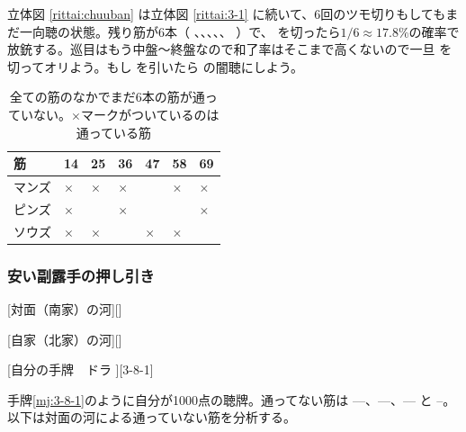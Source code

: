 \documentclass[10pt, twocolumn]{article}
\begin{document}
\begin{rittai}[h]
  \centering
  
  
  \caption{中盤の立体図}
  \label{rittai:chuuban}
\end{rittai}

立体図 \ref{rittai:chuuban} は立体図 \ref{rittai:3-1} に続いて、6回のツモ切りもしてもまだ一向聴の状態。残り筋が6本（ 、、、、、 ）で、 を切ったら$1/6\approx17.8\%$の確率で放銃する。巡目はもう中盤〜終盤なので和了率はそこまで高くないので一旦  を切ってオリよう。もし  を引いたら  の闇聴にしよう\citep[][pp. 40--45]{tetsuoshi}。

\begin{table}[ht]
  \centering
  \begin{tabular}{lllllll}
    筋    & 14 & 25 & 36 & 47 & 58 & 69 \\
    \hline
    マンズ & $\times$ & $\times$ & $\times$ & & $\times$ & $\times$ \\
    ピンズ & $\times$ & & $\times$ & & & $\times$ \\
    ソウズ & $\times$ & $\times$ & & $\times$ & $\times$ &
  \end{tabular}
  \caption{全ての筋のなかでまだ6本の筋が通っていない。$\times$マークがついているのは通っている筋}
\end{table}

\subsubsection*{安い副露手の押し引き}

[対面（南家）の河][]

[自家（北家）の河][]

[自分の手牌　ドラ ][3-8-1]

手牌\ref{mj:3-8-1}のように自分が1000点の聴牌。通ってない筋は ----、----、---- と --。以下は対面の河による通っていない筋を分析する\citep[][pp.~128--133]{tetsuoshi}。
\end{document}
